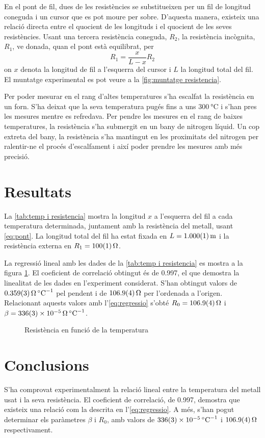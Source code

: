 En el pont de fil, dues de les resistències se substitueixen per un fil de longitud coneguda i un cursor que es pot moure per sobre. D'aquesta manera, existeix una relació directa entre el quocient de les longituds i el quocient de les seves resistències. Usant una tercera resistència coneguda, $R_2$, la resistència incògnita, $R_1$, ve donada, quan el pont està equilibrat, per
\begin{equation}\label{eq:pont}
R_1=\frac{x}{L-x}R_2
\end{equation}
on $x$ denota la longitud de fil a l'esquerra del cursor i $L$ la longitud total del fil. El muntatge experimental es pot veure a la \cref{fig:muntatge resistencia}. 

Per poder mesurar en el rang d'altes temperatures s'ha escalfat la resistència en un forn. S'ha deixat que la seva temperatura pugés fins a uns $\SI{300}{\celsius}$ i s'han pres les mesures mentre es refredava. Per pendre les mesures en el rang de baixes temperatures, la resistència s'ha submergit en un bany de nitrogen líquid. Un cop extreta del bany, la resistència s'ha mantingut en les proximitats del nitrogen per ralentir-ne el procés d'escalfament i així poder prendre les mesures amb més precisió. 

\section{Resultats}
La \cref{tab:temp i resistencia} mostra la longitud $x$ a l'esquerra del fil a cada temperatura determinada, juntament amb la resistència del metall, usant \cref{eq:pont}. La longitud total del fil ha estat fixada en $L=\data{1.000}{0.001}{\meter}$ i la resistència externa en $R_1=\data{100}{1}{\ohm}$.

La regressió lineal amb les dades de la \cref{tab:temp i resistencia} es mostra a la figura \ref{fig:temp v resistencia}. El coeficient de correlació obtingut és de 0.997, el que demostra la linealitat de les dades en l'experiment considerat. S'han obtingut valors de $\data{0.359}{0.003}{\ohm\per\celsius}$ pel pendent i de $\data{106.9}{0.4}{\ohm}$ per l'ordenada a l'origen. Relacionant aquests valors amb l'\cref{eq:regressio} s'obté $R_0=\data{106.9}{0.4}{\ohm}$ i $\beta=\data{336}{3e-5}{\ohm\per\celsius}$.

\begin{figure} [htb]
	\centering
	\small \sffamily
	
	\caption{Resistència en funció de la temperatura}
	\label{fig:temp v resistencia}
\end{figure}

\section{Conclusions}
S'ha comprovat experimentalment la relació lineal entre la temperatura del metall usat i la seva resistència. El coeficient de correlació, de 0.997, demostra que existeix una relació com la descrita en l'\ref{eq:regressio}. A més, s'han pogut determinar els paràmetres $\beta$ i $R_0$, amb valors de $\data{336}{3e-5}{\per\celsius}$ i $\data{106.9}{0.4}{\ohm}$ respectivament.
